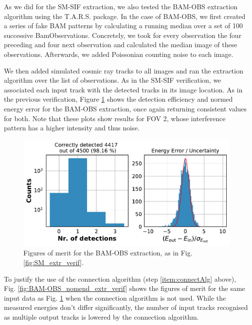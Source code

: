 \documentclass[a4paper, 11pt]{article}
\begin{document}
As we did for the SM-SIF extraction, we also tested the BAM-OBS extraction algorithm using the T.A.R.S. package. In the case of BAM-OBS, we first created a series of fake BAM patterns by calculating a running median over a set of 100 successive BamObservations. Concretely, we took for every observation the four preceding and four next observation and calculated the median image of these observations. Afterwards, we added Poissonian counting noise to each image.

We then added simulated cosmic ray tracks to all images and ran the extraction algorithm over the list of observations. As in the SM-SIF verification, we associated each input track with the detected tracks in its image location. As in the previous verification, Figure \ref{fig:BAM-OBS_extr_verif} shows the detection efficiency and normed energy error for the BAM-OBS extraction, once again returning consistent values for both. Note that these plots show results for FOV 2, whose interference pattern has a higher intensity and thus noise.

\begin{figure}
  \centering
    \includegraphics[width=\textwidth]{images/extraction/verification_bam-obs_mended}
    \caption{Figures of merit for the BAM-OBS extraction, as in Fig. \ref{fig:SM_extr_verif}.}
  \label{fig:BAM-OBS_extr_verif}
\end{figure}

To justify the use of the connection algorithm (step \ref{item:connectAlg} above), Fig. \ref{fig:BAM-OBS_nomend_extr_verif} shows the figures of merit for the same input data as Fig. \ref{fig:BAM-OBS_extr_verif} when the connection algorithm is not used. While the measured energies don't differ significantly, the number of input tracks recognised as multiple output tracks is lowered by the connection algorithm.
\end{document}
